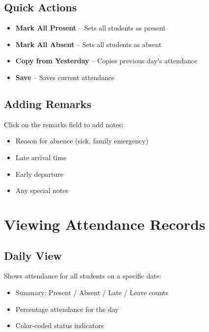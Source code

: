 \documentclass[12pt,a4paper]{report}
\begin{document}
\section{Quick Actions}

\begin{itemize}[leftmargin=*]
    \item \textbf{Mark All Present} -- Sets all students as present
    \item \textbf{Mark All Absent} -- Sets all students as absent
    \item \textbf{Copy from Yesterday} -- Copies previous day's attendance
    \item \textbf{Save} -- Saves current attendance
\end{itemize}

\section{Adding Remarks}

Click on the remarks field to add notes:
\begin{itemize}[leftmargin=*]
    \item Reason for absence (sick, family emergency)
    \item Late arrival time
    \item Early departure
    \item Any special notes
\end{itemize}

\chapter{Viewing Attendance Records}

\section{Daily View}

Shows attendance for all students on a specific date:
\begin{itemize}[leftmargin=*]
    \item Summary: Present / Absent / Late / Leave counts
    \item Percentage attendance for the day
    \item Color-coded status indicators
\end{itemize}
\end{document}
